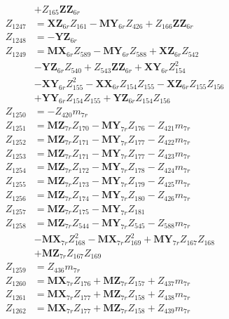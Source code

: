 \begin{multicols}{2}
\begin{align}
&+ Z_{165}\mathbf{ZZ}_{6r} \nonumber \\
Z_{1247} &= \mathbf{XZ}_{6r}Z_{161} - \mathbf{MY}_{6r}Z_{426} + Z_{166}\mathbf{ZZ}_{6r} \nonumber \\
Z_{1248} &= -\mathbf{YZ}_{6r} \nonumber \\
Z_{1249} &= \mathbf{MX}_{6r}Z_{589} - \mathbf{MY}_{6r}Z_{588} + \mathbf{XZ}_{6r}Z_{542}  \nonumber \\
&- \mathbf{YZ}_{6r}Z_{540} + Z_{543}\mathbf{ZZ}_{6r} + \mathbf{XY}_{6r}Z_{154}^2  \nonumber \\
&- \mathbf{XY}_{6r}Z_{155}^2 - \mathbf{XX}_{6r}Z_{154}Z_{155} - \mathbf{XZ}_{6r}Z_{155}Z_{156}  \nonumber \\
&+ \mathbf{YY}_{6r}Z_{154}Z_{155} + \mathbf{YZ}_{6r}Z_{154}Z_{156} \nonumber \\
Z_{1250} &= -Z_{420}m_{7r} \nonumber \\
Z_{1251} &= \mathbf{MZ}_{7r}Z_{170} - \mathbf{MY}_{7r}Z_{176} - Z_{421}m_{7r} \nonumber \\
Z_{1252} &= \mathbf{MZ}_{7r}Z_{171} - \mathbf{MY}_{7r}Z_{177} - Z_{422}m_{7r} \nonumber \\
Z_{1253} &= \mathbf{MZ}_{7r}Z_{171} - \mathbf{MY}_{7r}Z_{177} - Z_{423}m_{7r} \nonumber \\
Z_{1254} &= \mathbf{MZ}_{7r}Z_{172} - \mathbf{MY}_{7r}Z_{178} - Z_{424}m_{7r} \nonumber \\
Z_{1255} &= \mathbf{MZ}_{7r}Z_{173} - \mathbf{MY}_{7r}Z_{179} - Z_{425}m_{7r} \nonumber \\
Z_{1256} &= \mathbf{MZ}_{7r}Z_{174} - \mathbf{MY}_{7r}Z_{180} - Z_{426}m_{7r} \nonumber \\
Z_{1257} &= \mathbf{MZ}_{7r}Z_{175} - \mathbf{MY}_{7r}Z_{181} \nonumber \\
Z_{1258} &= \mathbf{MZ}_{7r}Z_{544} - \mathbf{MY}_{7r}Z_{545} - Z_{588}m_{7r}  \nonumber \\
&- \mathbf{MX}_{7r}Z_{168}^2 - \mathbf{MX}_{7r}Z_{169}^2 + \mathbf{MY}_{7r}Z_{167}Z_{168}  \nonumber \\
&+ \mathbf{MZ}_{7r}Z_{167}Z_{169} \nonumber \\
Z_{1259} &= Z_{436}m_{7r} \nonumber \\
Z_{1260} &= \mathbf{MX}_{7r}Z_{176} + \mathbf{MZ}_{7r}Z_{157} + Z_{437}m_{7r} \nonumber \\
Z_{1261} &= \mathbf{MX}_{7r}Z_{177} + \mathbf{MZ}_{7r}Z_{158} + Z_{438}m_{7r} \nonumber \\
Z_{1262} &= \mathbf{MX}_{7r}Z_{177} + \mathbf{MZ}_{7r}Z_{158} + Z_{439}m_{7r} \nonumber \\

\end{align}
\end{multicols}
